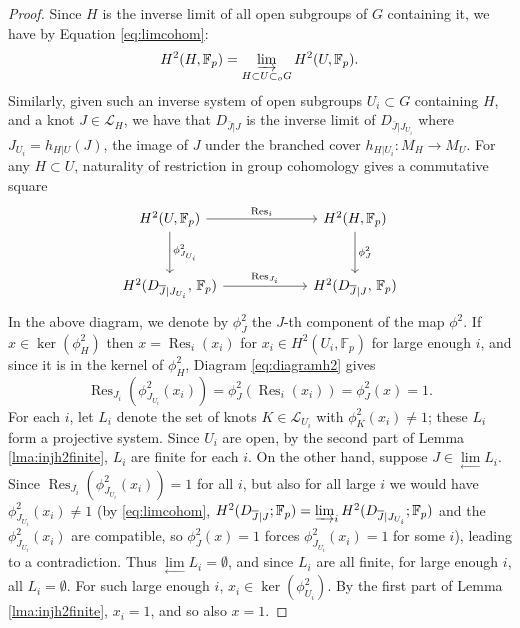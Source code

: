 \documentclass{amsart}
\theoremstyle{plain}
\theoremstyle{definition}
\theoremstyle{plain}
\theoremstyle{plain}
\theoremstyle{plain}
\theoremstyle{remark}
\theoremstyle{remark}
\theoremstyle{plain}
\theoremstyle{definition}
\theoremstyle{plain}
\DeclareMathOperator{\Res}{\mathrm{Res}}
\theoremstyle{plain}
\theoremstyle{plain}
\numberwithin{equation}{section}
\begin{document}
\begin{proof}
Since $H$ is the inverse limit of all open subgroups of $G$ containing it, we have by Equation \ref{eq:limcohom}:
\begin{equation}
    H^2(H, \mathbb{F}_p) = \varinjlim_{H \subset U \subset_o G}H^2(U, \mathbb{F}_p).
\end{equation}
Similarly, given such an inverse system of open subgroups $U_i \subset G$ containing $H$, and a knot $J\in \mathcal{L}_H$, we have that $D_{\bar J|J}$ is the inverse limit of $D_{\bar{J}|J_{U_i}}$ where $J_{U_i}=h_{H|U}(J)$, the image of $J$ under the branched cover $h_{H|U_i}: M_H \to M_U$. 
 For any $H \subset U$, naturality of restriction in group cohomology gives a commutative square
\begin{equation}\label{eq:diagramh2}
\begin{tikzcd}[row sep=3em, column sep=6em]
H^2(U,\mathbb{F}_p)
  \arrow[d, "\phi^2_{J_{U_i}}"]
  \arrow[r, "\mathrm{Res}_i"]
&
H^2(H,\mathbb{F}_p)
  \arrow[d,  "\phi^2_{J}"]
\\
 H^2(D_{\overline{J}|J_{U_i}}, \,\mathbb{F}_p)
  \arrow[r,"\mathrm{Res}_{J_{i}}"]
&
H^2(D_{\overline{J}|J},\,\mathbb{F}_p)
\end{tikzcd}
\end{equation}
In the above diagram, we denote by $\phi^2_J$ the $J$-th component of the map $\phi^2$. If $x \in \ker(\phi^2_H)$ then $x = \Res_i(x_i)$ for $x_i \in H^2(U_i, \mathbb F_p)$ for large enough $i$, and since it is in the kernel of $\phi_H^2$, Diagram \ref{eq:diagramh2} gives
\begin{equation}
    \Res_{J_i}(\phi^2_{J_{U_i}}(x_i))=\phi^2_J(\Res_i(x_i))=\phi^2_J(x)=1.
\end{equation}
For each $i$, let $L_i$ denote the set of knots $K \in \mathcal L_{U_i}$ with $\phi^2_K(x_i)\neq 1$; these $L_i$ form a projective system. Since $U_i$ are open, by the second part of Lemma \ref{lma:injh2finite}, $L_i$ are finite for each $i$. On the other hand, suppose $J\in\underset{\leftarrow}{\lim}L_i$. Since $\Res_{J_i}(\phi^2_{J_{U_i}}(x_i))=1$ for all $i$, but also for all large $i$ we would have $\phi^2_{J_{U_i}}(x_i)\neq1$ (by \ref{eq:limcohom}, $H^2(D_{\overline J|J}; \mathbb F_p) = \varinjlim_iH^2(D_{\overline J|J_{U_i}}; \mathbb F_p)$ and the $\phi^2_{J_{U_i}}(x_i)$ are compatible, so $\phi_J^2(x) = 1$ forces $\phi^2_{J_{U_i}}(x_i) = 1$ for some $i$), leading to a contradiction. Thus $\underset{\leftarrow}{\lim}L_i=\emptyset$, and since $L_i$ are all finite, for large enough $i$, all $L_i=\emptyset$. For such large enough $i$, $x_i\in\ker(\phi^2_{U_i})$. By the first part of Lemma \ref{lma:injh2finite}, $x_i=1$, and so also $x=1$.
\end{proof}
\end{document}
